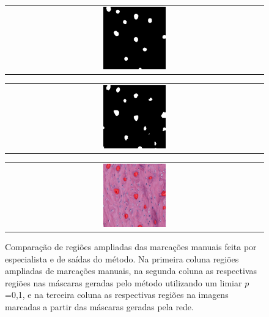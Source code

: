 \begin{figure}[h]
    \begin{tabular}{@{}c@{}}
        \includegraphics[width=0.25\textwidth]{figures/4_results/204_r4c2_mask_manual_10.png}
        \\[\abovecaptionskip]
    \end{tabular}
    \begin{tabular}{@{}c@{}}
        \includegraphics[width=0.25\textwidth]{figures/4_results/204_r4c2_mask_net_10.png}
        \\[\abovecaptionskip]
    \end{tabular}
    \begin{tabular}{@{}c@{}}
        \includegraphics[width=0.25\textwidth]{figures/4_results/204_r4c2_net_out_10.png}
        \\[\abovecaptionskip]
    \end{tabular}
  
    \caption[Comparação de regiões ampliadas das marcações manuais feita por especialista e de saídas do método]{Comparação de regiões ampliadas das marcações manuais feita por especialista e de saídas do método. Na primeira coluna regiões ampliadas de marcações manuais, na segunda coluna as respectivas regiões nas máscaras geradas pelo método utilizando um limiar $p$=0,1, e na terceira coluna as respectivas regiões na imagens marcadas a partir das máscaras geradas pela rede.}
    \label{fig:marcacoes-final-canal-regioes}
\end{figure}

